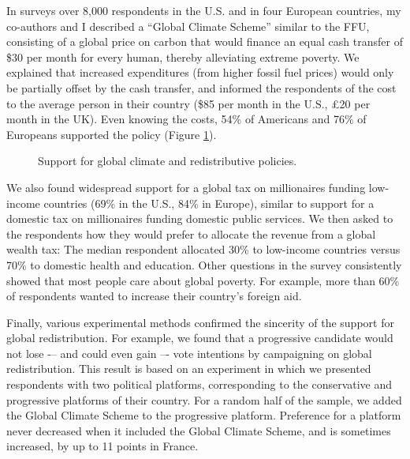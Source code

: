 \documentclass[12pt,english]{article}
\begin{document}

In surveys over 8,000 respondents in the U.S. and in four European countries,\citep{fabre_majority_2025} my co-authors and I described a ``Global Climate Scheme'' similar to the FFU, consisting of a global price on carbon that would finance an equal cash transfer of \$30 per month for every human, thereby alleviating extreme poverty. We explained that increased expenditures (from higher fossil fuel prices) would only be partially offset by the cash transfer, and informed the respondents of the cost to the average person in their country (\$85 per month in the U.S., £20 per month in the UK). Even knowing the costs, 54\% of Americans and 76\% of Europeans supported the policy (Figure \ref{fig:support}). 

\begin{figure}[h] %
  \caption[Support for global policies]{Support for global climate and redistributive policies.} 
  \label{fig:support} 
\end{figure}

We also found widespread support for a global tax on millionaires funding low-income countries (69\% in the U.S., 84\% in Europe), similar to support for a domestic tax on millionaires funding domestic public services. We then asked to the respondents how they would prefer to allocate the revenue from a global wealth tax: The median respondent allocated 30\% to low-income countries versus 70\% to domestic health and education. Other questions in the survey consistently showed that most people care about global poverty. For example, more than 60\% of respondents wanted to increase their country's foreign aid.

Finally, various experimental methods confirmed the sincerity of the support for global redistribution. For example, we found that a progressive candidate would not lose -– and could even gain –- vote intentions by campaigning on global redistribution. This result is based on an experiment in which we presented respondents with two political platforms, corresponding to the conservative and progressive platforms of their country. For a random half of the sample, we added the Global Climate Scheme to the progressive platform. Preference for a platform never decreased when it included the Global Climate Scheme, and is sometimes increased, by up to 11 points in France.
\end{document}
